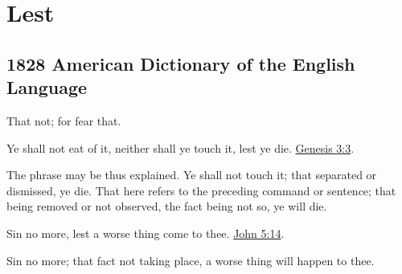 \section{Lest}
	\label{LEST}
	

\subsection{1828 American Dictionary of the English Language} %
	\label{LEST-1828}

	\begin{compactitem}
		\item That not; for fear that.
		\item Ye shall not eat of it, neither shall ye touch it, lest ye die. \hyperref[GENESIS-3-3]{Genesis 3:3}.
			\begin{compactitem}
				\item The phrase may be thus explained. Ye shall not touch it; that separated or dismissed, ye die. That here refers to the preceding command or sentence; that being removed or not observed, the fact being not so, ye will die.
			\end{compactitem}
		\item Sin no more, lest a worse thing come to thee. \hyperref[JOHN-5-14]{John 5:14}.
			\begin{compactitem}
				\item Sin no more; that fact not taking place, a worse thing will happen to thee.
			\end{compactitem}
	\end{compactitem}


	
